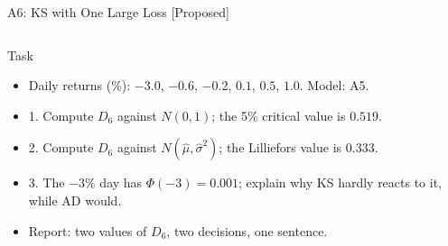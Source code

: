 \begin{frame}{A6: KS with One Large Loss [Proposed]}
\propsub
\itemsize{\scriptsize}
\begin{columns}[T]
\begin{column}{\taskw}
\begin{block}{Task}
\begin{itemize}
    \item Daily returns (\%): $-3.0$, $-0.6$, $-0.2$, $0.1$, $0.5$, $1.0$. Model: A5.
    \item 1. Compute $D_6$ against $N(0, 1)$; the 5\% critical value is $0.519$.
    \item 2. Compute $D_6$ against $N(\hat\mu, \hat\sigma^2)$; the Lilliefors value is $0.333$.
    \item 3. The $-3\%$ day has $\Phi(-3) = 0.001$; explain why KS hardly reacts to it, while AD would.
    \item Report: two values of $D_6$, two decisions, one sentence.
\end{itemize}
\end{block}
\end{column}
\begin{column}{\solw}
\end{column}
\end{columns}
\end{frame}

